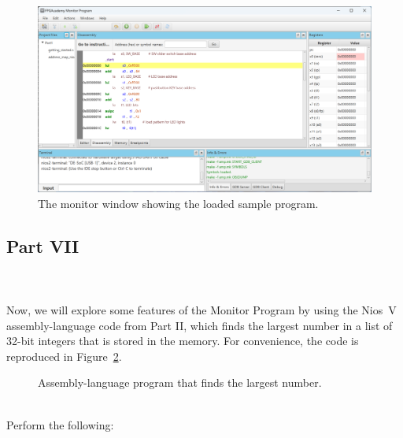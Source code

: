 \documentclass[epsfig,10pt,fullpage]{article}
\begin{document}
\begin{enumerate}
\begin{figure}[H]
	\begin{center}
	\includegraphics[scale=0.33]{figures/Snap11.png}
	\end{center}
	\caption{The monitor window showing the loaded sample program.}
\label{fig:MP9}
\end{figure}

\end{enumerate}

\subsection*{Part VII}
~\\
~\\
\noindent
Now, we will explore some features of the Monitor Program by using the Nios~V
assembly-language code from Part II, which finds the largest number in a 
list of 32-bit integers that is stored in the memory. For convenience, the code is reproduced 
in Figure~\ref{fig:code_repeat}.

\begin{figure}[H]
\begin{center}

\end{center}
\caption{Assembly-language program that finds the largest number.}
\label{fig:code_repeat}
\end{figure}

~\\
\noindent
Perform the following:
\end{document}
